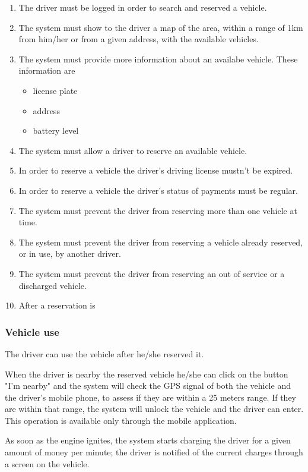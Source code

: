 \begin{enumerate}
	\item The driver must be logged in order to search and reserved a vehicle.
	\item The system must show to the driver a map of the area, within a range of 1km from him/her or from a given address, with the available vehicles.
	\item The system must provide more information about an availabe vehicle. These information are
		\begin{itemize}
			\item license plate
			\item address
			\item battery level
		\end{itemize}
	\item The system must allow a driver to reserve an available vehicle.
	\item In order to reserve a vehicle the driver's driving license mustn't be expired. \label{f-expired}
	\item In order to reserve a vehicle the driver's status of payments must be regular. \label{f-regular}
	\item The system must prevent the driver from reserving more than one vehicle at time.
	\item The system must prevent the driver from reserving a vehicle already reserved, or in use, by another driver.
	\item The system must prevent the driver from reserving an out of service or a discharged vehicle.
	\item After a reservation is 
\end{enumerate}

\subsubsection{Vehicle use}

The driver can use the vehicle after he/she reserved it.

When the driver is nearby the reserved vehicle he/she can click on the button "I'm nearby" and the system will check the GPS signal of both the vehicle and the driver's mobile phone, to assess if they are within a 25 meters range. If they are within that range, the system will unlock the vehicle and the driver can enter. This operation is available only through the mobile application.

As soon as the engine ignites, the system starts charging the driver for a given amount of money per minute; the driver is notified of the current charges through a screen on the vehicle.

